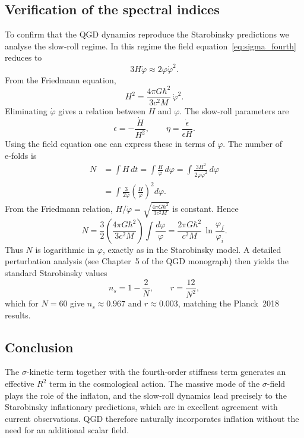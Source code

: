 \subsection{Verification of the spectral indices}
To confirm that the QGD dynamics reproduce the Starobinsky predictions we analyse the slow‑roll regime. In this regime the field equation~\eqref{eq:sigma_fourth} reduces to
\begin{equation}
3H\dot\varphi \approx 2\varphi\dot\varphi^2.
\end{equation}
From the Friedmann equation,
\begin{equation}
H^2 = \frac{4\pi G\hbar^2}{3c^2 M}\,\dot\varphi^2.
\end{equation}
Eliminating $\dot\varphi$ gives a relation between $H$ and $\varphi$. The slow‑roll parameters are
\begin{equation}
\epsilon = -\frac{\dot H}{H^2},\qquad \eta = \frac{\dot\epsilon}{\epsilon H}.
\end{equation}
Using the field equation one can express these in terms of $\varphi$. The number of e‑folds is
\begin{align}
N &= \int H\,dt = \int\frac{H}{\dot\varphi}\,d\varphi
   = \int\frac{3H^2}{2\varphi\dot\varphi^2}\,d\varphi \\
  &= \int\frac{3}{2\varphi}\left(\frac{H}{\dot\varphi}\right)^2 d\varphi.
\end{align}
From the Friedmann relation, $H/\dot\varphi = \sqrt{\frac{4\pi G\hbar^2}{3c^2M}}$ is constant. Hence
\begin{equation}
N = \frac{3}{2}\left(\frac{4\pi G\hbar^2}{3c^2M}\right)\int\frac{d\varphi}{\varphi}
    = \frac{2\pi G\hbar^2}{c^2M}\,\ln\frac{\varphi_f}{\varphi_i}.
\end{equation}
Thus $N$ is logarithmic in $\varphi$, exactly as in the Starobinsky model. A detailed perturbation analysis (see Chapter~5 of the QGD monograph) then yields the standard Starobinsky values
\begin{equation}
n_s = 1 - \frac{2}{N},\qquad r = \frac{12}{N^2},
\end{equation}
which for $N=60$ give $n_s\approx0.967$ and $r\approx0.003$, matching the Planck~2018 results.

\subsection{Conclusion}
The $\sigma$-kinetic term together with the fourth‑order stiffness term generates an effective $R^2$ term in the cosmological action. The massive mode of the $\sigma$-field plays the role of the inflaton, and the slow‑roll dynamics lead precisely to the Starobinsky inflationary predictions, which are in excellent agreement with current observations. QGD therefore naturally incorporates inflation without the need for an additional scalar field.
